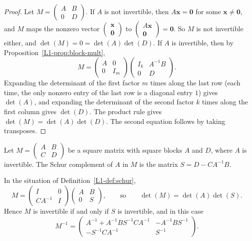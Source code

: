 \begin{proof}
    Let $M = \begin{pmatrix} A & B \\ 0 & D \end{pmatrix}$. If $A$ is not invertible, then $A\mathbf{x} = \mathbf{0}$ for some $\mathbf{x} \neq \mathbf{0}$, and $M$ maps the nonzero vector $\begin{pmatrix} \mathbf{x} \\ \mathbf{0} \end{pmatrix}$ to $\begin{pmatrix} A\mathbf{x} \\ \mathbf{0} \end{pmatrix} = \mathbf{0}$. So $M$ is not invertible either, and $\det(M) = 0 = \det(A)\det(D)$. If $A$ is invertible, then by Proposition~\ref{L1-prop:block-mult},
    \[M = \begin{pmatrix} A & 0 \\ 0 & I_m \end{pmatrix}\begin{pmatrix} I_k & A^{-1}B \\ 0 & D \end{pmatrix}.\]
    Expanding the determinant of the first factor $m$ times along the last row (each time, the only nonzero entry of the last row is a diagonal entry $1$) gives $\det(A)$, and expanding the determinant of the second factor $k$ times along the first column gives $\det(D)$. The product rule gives $\det(M) = \det(A)\det(D)$. The second equation follows by taking transposes.
\end{proof}

\begin{definition}\label{L1-def:schur}
    Let $M = \begin{pmatrix} A & B \\ C & D \end{pmatrix}$ be a square matrix with square blocks $A$ and $D$, where $A$ is invertible. The Schur complement of $A$ in $M$ is the matrix $S = D - CA^{-1}B$.
\end{definition}

\begin{theorem}\label{L1-thm:schur}
    In the situation of Definition~\ref{L1-def:schur},
    \[M = \begin{pmatrix} I & 0 \\ CA^{-1} & I \end{pmatrix}\begin{pmatrix} A & B \\ 0 & S \end{pmatrix}, \qquad \text{so} \qquad \det(M) = \det(A)\det(S).\]
    Hence $M$ is invertible if and only if $S$ is invertible, and in this case
    \[M^{-1} = \begin{pmatrix} A^{-1} + A^{-1}BS^{-1}CA^{-1} & -A^{-1}BS^{-1} \\ -S^{-1}CA^{-1} & S^{-1} \end{pmatrix}.\]
\end{theorem}

